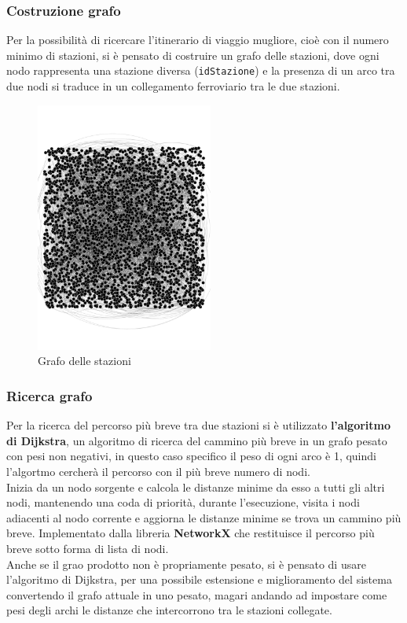 \documentclass[italian,12pt,a4paper]{article}
\begin{document}
\subsubsection{Costruzione grafo}
	Per la possibilità di ricercare l'itinerario di viaggio mugliore, cioè con il numero minimo di stazioni, si è pensato di costruire un grafo delle stazioni, dove ogni nodo rappresenta una stazione diversa (\texttt{idStazione}) e la presenza di un arco tra due nodi si traduce in un collegamento ferroviario tra le due stazioni.
	\\
	\begin{figure}[t]
		\centering
		\includegraphics[width=220px]{img/stations}
		\caption{Grafo delle stazioni}
		\label{fig:stationsgraph}
	\end{figure}
	
\subsubsection{Ricerca grafo}
	
		Per la ricerca del percorso più breve tra due stazioni si è utilizzato \textbf{l'algoritmo di Dijkstra}, un algoritmo di ricerca del cammino più breve in un grafo pesato con pesi non negativi, in questo caso specifico il peso di ogni arco è 1, quindi l'algortmo cercherà il percorso con il più breve numero di nodi.\\
		Inizia da un nodo sorgente e calcola le distanze minime da esso a tutti gli altri nodi, mantenendo una coda di priorità, durante l'esecuzione, visita i nodi adiacenti al nodo corrente e aggiorna le distanze minime se trova un cammino più breve. Implementato dalla libreria \textbf{NetworkX} che restituisce il percorso più breve sotto forma di lista di nodi. \\
		\linebreak
		Anche se il grao prodotto non è propriamente pesato, si è pensato di usare l'algoritmo di Dijkstra, per una possibile estensione e miglioramento del sistema convertendo il grafo attuale in uno pesato, magari andando ad impostare come pesi degli archi le distanze che intercorrono tra le stazioni collegate.
		
\end{document}

